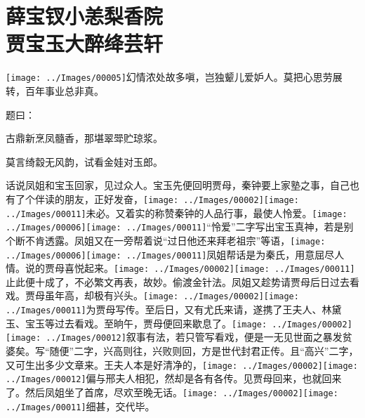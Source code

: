 %
%
%
%
%
%
%


\chapter{薛宝钗小恙梨香院\\贾宝玉大醉绛芸轩}
{\texttt{[image: ../Images/00005]}\kaishu 幻情浓处故多嗔，岂独颦儿爱妒人。莫把心思劳展转，百年事业总非真。}

题曰：

古鼎新烹凤髓香，那堪翠斝贮琼浆。

莫言绮縠无风韵，试看金娃对玉郎。

话说凤姐和宝玉回家，见过众人。宝玉先便回明贾母，秦钟要上家塾之事，自己也有了个伴读的朋友，正好发奋，{\texttt{[image: ../Images/00002]}\texttt{[image: ../Images/00011]}\footnotesize \kaishu 未必。}又着实的称赞秦钟的人品行事，最使人怜爱。{\texttt{[image: ../Images/00006]}\texttt{[image: ../Images/00011]}\footnotesize \kaishu ``怜爱''二字写出宝玉真神，若是别个断不肯透露。}凤姐又在一旁帮着说``过日他还来拜老祖宗''等语，{\texttt{[image: ../Images/00006]}\texttt{[image: ../Images/00011]}\footnotesize \kaishu 凤姐帮话是为秦氏，用意屈尽人情。}说的贾母喜悦起来。{\texttt{[image: ../Images/00002]}\texttt{[image: ../Images/00011]}\footnotesize \kaishu 止此便十成了，不必繁文再表，故妙。偷渡金针法。}凤姐又趁势请贾母后日过去看戏。贾母虽年高，却极有兴头。{\texttt{[image: ../Images/00002]}\texttt{[image: ../Images/00011]}\footnotesize \kaishu 为贾母写传。}至后日，又有尤氏来请，遂携了王夫人、林黛玉、宝玉等过去看戏。至晌午，贾母便回来歇息了。{\texttt{[image: ../Images/00002]}\texttt{[image: ../Images/00012]}\footnotesize \kaishu 叙事有法，若只管写看戏，便是一无见世面之暴发贫婆矣。写``随便''二字，兴高则往，兴败则回，方是世代封君正传。且``高兴''二字，又可生出多少文章来。}王夫人本是好清净的，{\texttt{[image: ../Images/00002]}\texttt{[image: ../Images/00012]}\footnotesize \kaishu 偏与邢夫人相犯，然却是各有各传。}见贾母回来，也就回来了。然后凤姐坐了首席，尽欢至晚无话。{\texttt{[image: ../Images/00002]}\texttt{[image: ../Images/00011]}\footnotesize \kaishu 细甚，交代毕。}

